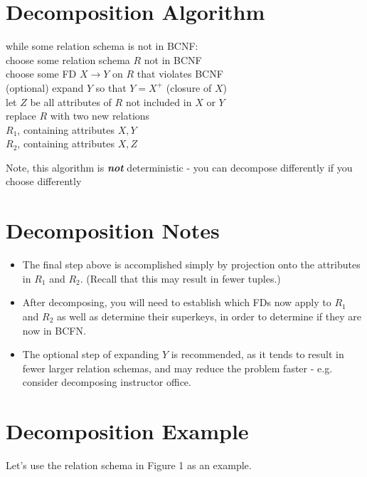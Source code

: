 \documentclass{../cheatsheet}
\begin{document}
\begin{multicols*}{2}
    \section{Decomposition Algorithm}
    while some relation schema is not in BCNF: \\
    \tab choose some relation schema $R$ not in BCNF \\
    \tab choose some FD $X \rightarrow Y$ on $R$ that violates BCNF \\
    \tab (optional) expand $Y$ so that $Y = X^{+}$ (closure of $X$) \\
    \tab let $Z$ be all attributes of $R$ not included in $X$ or $Y$ \\
    \tab replace $R$ with two new relations \\
    \tab\tab $R_1$, containing attributes ${X, Y}$ \\
    \tab\tab $R_2$, containing attributes ${X, Z}$

    Note, this algorithm is \textbf{\textit{not}} deterministic - you can decompose
    differently if you choose differently

    \section{Decomposition Notes}
    \begin{itemize}
        \item The final step above is accomplished simply by projection onto the
            attributes in $R_1$ and $R_2$. (Recall that this may result in fewer
            tuples.)

        \item After decomposing, you will need to establish which FDs now apply to
            $R_1$ and $R_2$ as well as determine their superkeys, in order to
            determine if they are now in BCFN.

        \item The optional step of expanding $Y$ is recommended, as it tends to
            result in fewer larger relation schemas, and may reduce the problem
            faster - e.g. consider decomposing instructor \textrightarrow office.
    \end{itemize}

    \section{Decomposition Example}
    Let's use the relation schema in Figure 1 as an example.


\end{multicols*}
\end{document}
